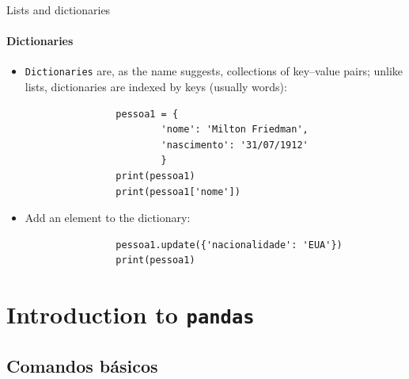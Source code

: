 \documentclass[notes,11pt, aspectratio=169, xcolor=table]{beamer}
\begin{document}
    \begin{frame}[fragile=singleslide]{Lists and dictionaries}
    \framesubtitle{Dictionaries}
        
         \begin{itemize}
            \item \texttt{Dictionaries} are, as the name suggests, collections of key–value pairs; unlike lists, dictionaries are indexed by keys (usually words):

                \begin{verbatim}
                pessoa1 = {
                        'nome': 'Milton Friedman',
                        'nascimento': '31/07/1912'
                        }
                print(pessoa1)
                print(pessoa1['nome'])
                \end{verbatim}    

            \item Add an element to the dictionary:

                \begin{verbatim}
                pessoa1.update({'nacionalidade': 'EUA'})
                print(pessoa1)
                \end{verbatim}    

        \end{itemize}             

    
   

    \end{frame}

    \section{Introduction to \texttt{pandas}}

        \subsection{Comandos básicos}
\end{document}
